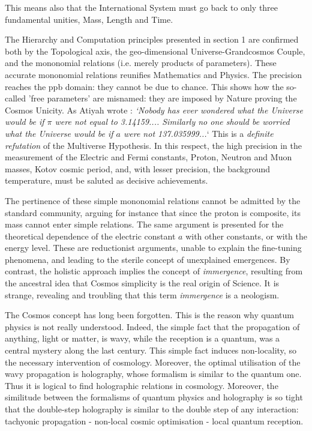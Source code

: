 \documentclass[twoside,draft]{article}
\begin{document}
\begin{sloppypar}
This means also that the International System must go back to only three fundamental unities,
Mass, Length and Time.

The Hierarchy and Computation principles presented in section 1 are confirmed both by the Topological axis, the geo-dimensional Universe-Grandcosmos Couple, and the mononomial relations (i.e. merely products of parameters). These accurate mononomial relations reunifies Mathematics and Physics. The precision reaches the ppb domain: they cannot be due to chance. This shows how the so-called 'free parameters' are misnamed: they are imposed by Nature proving the Cosmos Unicity. As Atiyah wrote \cite{Atiyah1}: \textit{`Nobody has ever wondered what the Universe would be if $\pi$ were not equal to 3.14159.... Similarly no one should be worried what the Universe would be if $a$ were not 137.035999...}` This is a \textit{definite refutation} of the Multiverse Hypothesis. In this respect, the high precision in the measurement of the Electric and Fermi constants, Proton, Neutron and Muon masses, Kotov cosmic period, and, with lesser precision, the background temperature, must be saluted as decisive achievements.

The pertinence of these simple mononomial relations cannot be admitted by the standard community, arguing for instance that since the proton is composite, its mass cannot enter simple relations. The same argument is presented for the theoretical dependence of the electric constant $a$ with other constants, or with the energy level. These are reductionist arguments, unable to explain the fine-tuning phenomena, and leading to the sterile concept of unexplained emergences. By contrast, the holistic approach implies the concept of \textit{immergence}, resulting from the ancestral idea that Cosmos simplicity is the real origin of Science. It is strange, revealing and troubling that this term \textit{immergence} is a neologism.

The Cosmos concept has long been forgotten. This is the reason why quantum physics is not really understood. Indeed, the simple fact that the propagation of anything, light or matter, is wavy, while the reception is a quantum, was a central mystery along the last century. This simple fact induces non-locality, so the necessary intervention of cosmology. Moreover, the optimal utilisation of the wavy propagation is holography, whose formalism is similar to the quantum one. Thus it is logical to find holographic relations in cosmology. Moreover, the similitude between the formalisms of quantum physics and holography is so tight that the double-step holography is similar to the double step of any interaction: tachyonic propagation - non-local cosmic optimisation - local quantum reception.


\end{sloppypar}
\end{document}
